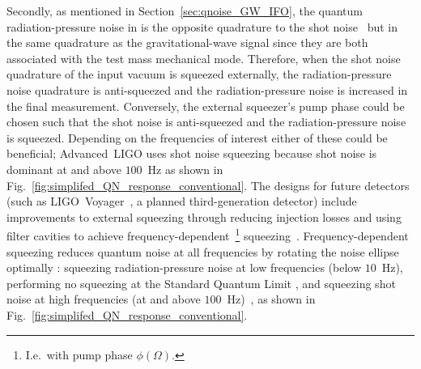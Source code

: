 Secondly, as mentioned in Section~\ref{sec:qnoise_GW_IFO}, the quantum radiation-pressure noise in is the opposite quadrature to the shot noise~\cite{}  but in the same quadrature as the gravitational-wave signal since they are both associated with the test mass mechanical mode. Therefore, when the shot noise quadrature of the input vacuum is squeezed externally, the radiation-pressure noise quadrature is anti-squeezed and the radiation-pressure noise is increased in the final measurement. Conversely, the external squeezer's pump phase could be chosen such that the shot noise is anti-squeezed and the radiation-pressure noise is squeezed. Depending on the frequencies of interest either of these could be beneficial; Advanced~LIGO uses shot noise squeezing because shot noise is dominant at and above $100$~Hz as shown in Fig.~\ref{fig:simplifed_QN_response_conventional}. The designs for future detectors (such as LIGO~Voyager~\cite{}, a planned third-generation detector) include improvements to external squeezing through reducing injection losses and using filter cavities to achieve frequency-dependent~\footnote{I.e.\ with pump phase $\phi(\Omega)$.} squeezing~\cite{}. Frequency-dependent squeezing reduces quantum noise at all frequencies by rotating the noise ellipse optimally : squeezing radiation-pressure noise at low frequencies (below $10$~Hz), performing no squeezing at the Standard Quantum Limit , and squeezing shot noise at high frequencies (at and above $100$~Hz)~\cite{}, as shown in Fig.~\ref{fig:simplifed_QN_response_conventional}. 
